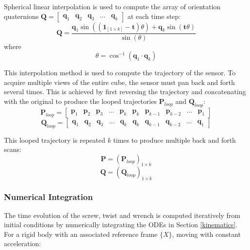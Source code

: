 Spherical linear interpolation is used to compute the array of orientation quaternions
$\mathbf{Q}= \begin{bmatrix}
	\mathbf{q}_1 & \mathbf{q}_2 & \mathbf{q}_3 & \dots & \mathbf{q}_k
\end{bmatrix}$
at each time step:
\begin{equation} \label{slerp}
	\mathbf{Q} = \frac{\mathbf{q}_1\sin((\mathbf{1}_{[1 \times k]}-\mathbf{t})\theta) + \mathbf{q}_k\sin(\mathbf{t}\theta)}{\sin(\theta)}
\end{equation}
where
\begin{equation}
	\theta = \cos^{-1}(\mathbf{q}_1 \cdot \mathbf{q}_k)
\end{equation}

This interpolation method is used to compute the trajectory of the sensor. To acquire multiple views of the  entire cube, the sensor must pan back and forth several times. This is achieved by first reversing the trajectory and concatenating with the original to produce the looped trajectories $\mathbf{P}_{loop}$ and $\mathbf{Q}_{loop}$:
\begin{equation}
	\mathbf{P}_{loop}= 
	\begin{bmatrix}
		\mathbf{p}_1 & \mathbf{p}_2 & \mathbf{p}_3 & \dots & \mathbf{p}_k &
		\mathbf{p}_{k} & \mathbf{p}_{k-1} & \mathbf{p}_{k-2} & \dots & \mathbf{p}_1
	\end{bmatrix}
\end{equation}
\begin{equation}
	\mathbf{Q}_{loop}= 
	\begin{bmatrix}
		\mathbf{q}_1 & \mathbf{q}_2 & \mathbf{q}_3 & \dots & \mathbf{q}_k &
		\mathbf{q}_{k} & \mathbf{q}_{k-1} & \mathbf{q}_{k-2} & \dots & \mathbf{q}_1
	\end{bmatrix}
\end{equation}

This looped trajectory is repeated $k$ times to produce multiple back and forth scans:
\begin{equation}
	\mathbf{P} = ({\mathbf{P}_{loop}})_{1 \times k}
\end{equation}
\begin{equation}
	\mathbf{Q} = ({\mathbf{Q}_{loop}})_{1 \times k}
\end{equation}


\subsubsection{Numerical Integration} \label{integration}
The time evolution of the screw, twist and wrench is computed iteratively from initial conditions by numerically integrating the ODEs in Section \ref{kinematics}. For a rigid body with an associated reference frame $\{X\}$, moving with constant acceleration:

